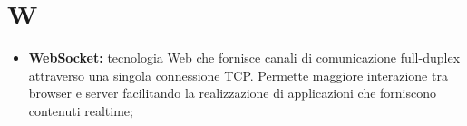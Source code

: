 \section*{W} %
\label{sec:w}
	\begin{itemize}
		\item \textbf{WebSocket:} tecnologia Web che fornisce canali di comunicazione full-duplex attraverso una singola connessione TCP. Permette maggiore interazione tra browser e server facilitando la realizzazione di applicazioni che forniscono contenuti realtime;
	\end{itemize}
\pagebreak
